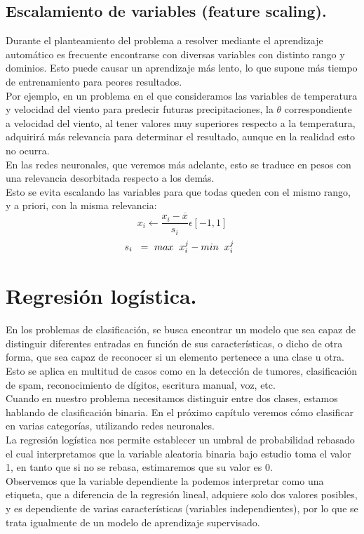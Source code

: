 \documentclass[a4paper,10pt]{article}
\begin{document}
\subsection{Escalamiento de variables (feature scaling).}

Durante el planteamiento del problema a resolver mediante el aprendizaje automático es frecuente encontrarse con diversas variables con distinto rango y dominios. Esto puede causar un aprendizaje más lento, lo que supone más tiempo de entrenamiento para peores resultados. \\
Por ejemplo, en un problema en el que consideramos las variables de temperatura y velocidad del viento para predecir futuras precipitaciones, la $\theta$ correspondiente a  velocidad del viento, al tener valores muy superiores respecto a la temperatura, adquirirá más relevancia para determinar el resultado, aunque en la realidad esto no ocurra.\\ En las redes neuronales, que veremos más adelante, esto se traduce en pesos con una relevancia desorbitada respecto a los demás.\\
Esto se evita escalando las variables para que todas queden con el mismo rango, y a priori, con la misma relevancia:
\[
x_i \longleftarrow \frac{x_i - \overline{x}}{s_i} \epsilon [-1,1]
\]
\hspace{0.20cm}
\[
s_i \hspace{0.20cm} = \  max\hspace{0.20cm}x_{i}^j -min\hspace{0.20cm}x_{i}^j \hspace{0.20cm}
\]
\newpage
\section{Regresión logística.}
En los problemas de clasificación, se busca encontrar un modelo que sea capaz de distinguir diferentes entradas en función de sus características, o dicho de otra forma, que sea capaz de reconocer si un elemento pertenece a una clase u otra. Esto se aplica
en multitud de casos como en la detección de tumores, clasificación de spam,
reconocimiento de dígitos, escritura manual, voz, etc.
 \\Cuando en nuestro problema necesitamos distinguir entre dos clases, estamos hablando de clasificación binaria. En el próximo
capítulo veremos cómo clasificar en varias categorías, utilizando redes neuronales.\\
La regresión logística nos permite establecer un umbral de probabilidad rebasado el cual interpretamos que la variable aleatoria binaria bajo estudio toma el valor
1, en tanto que si no se rebasa, estimaremos que su valor es 0.
\\Observemos que la variable dependiente la podemos interpretar como una etiqueta, que a diferencia de la regresión lineal, adquiere solo dos valores posibles,
y es dependiente de varias características (variables independientes), por lo que
se trata igualmente de un modelo de aprendizaje supervisado.
\end{document}
